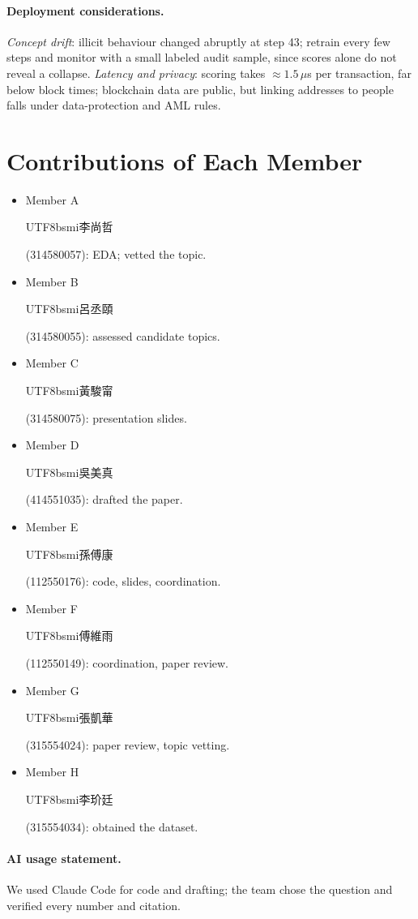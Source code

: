 \documentclass[11pt]{article}
\newcommand{\zh}[1]{\begin{CJK}{UTF8}{bsmi}#1\end{CJK}}
\newcommand{\member}[3]{\ifdefined\anonymous Member #1\else\zh{#2} (#3)\fi}
\begin{document}
\paragraph{Deployment considerations.}
\emph{Concept drift}: illicit behaviour changed abruptly at step 43; retrain every few steps and monitor with a small labeled audit sample, since scores alone do not reveal a collapse.
\emph{Latency and privacy}: scoring takes ${\approx}1.5\,\mu$s per transaction, far below block times; blockchain data are public, but linking addresses to people falls under data-protection and AML rules.

\section*{Contributions of Each Member}

{\raggedright{}
\begin{itemize}[leftmargin=*,itemsep=0pt,topsep=2pt]
\item \member{A}{李尚哲}{314580057}: EDA; vetted the topic.
\item \member{B}{呂丞頤}{314580055}: assessed candidate topics.
\item \member{C}{黃駿甯}{314580075}: presentation slides.
\item \member{D}{吳美真}{414551035}: drafted the paper.
\item \member{E}{孫傅康}{112550176}: code, slides, coordination.
\item \member{F}{傅維雨}{112550149}: coordination, paper review.
\item \member{G}{張凱華}{315554024}: paper review, topic vetting.
\item \member{H}{李玠廷}{315554034}: obtained the dataset.
\end{itemize}
}

\paragraph{AI usage statement.}
We used Claude Code for code and drafting; the team chose the question and verified every number and citation.


\end{document}

